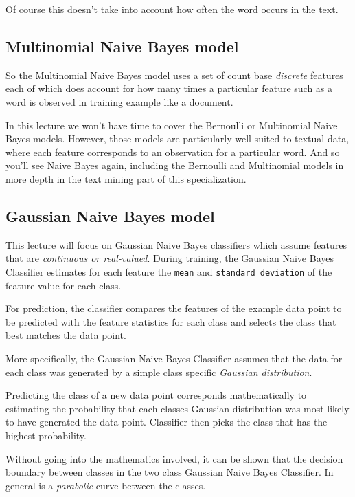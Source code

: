 Of course this doesn't take into account how often the word occurs in the text. 

\subsection{Multinomial Naive Bayes model}

So the Multinomial Naive Bayes model uses a set of count base \emph{discrete} features each of which does account for how many times a particular feature such as a word is observed in training example like a document. 

In this lecture we won't have time to cover the Bernoulli or Multinomial Naive Bayes models. However, those models are particularly well suited to textual data, where each feature corresponds to an observation for a particular word. And so you'll see Naive Bayes again, including the Bernoulli and Multinomial models in more depth in the text mining part of this specialization. 

\subsection{Gaussian Naive Bayes model}

This lecture will focus on Gaussian Naive Bayes classifiers which assume features that are \emph{continuous or real-valued}. During training, the Gaussian Naive Bayes Classifier estimates for each feature the \texttt{mean} and \texttt{standard deviation} of the feature value for each class. 

For prediction, the classifier compares the features of the example data point to be predicted with the feature statistics for each class and selects the class that best matches the data point. 

More specifically, the Gaussian Naive Bayes Classifier assumes that the data for each class was generated by a simple class specific \emph{Gaussian distribution}. 

Predicting the class of a new data point corresponds mathematically to estimating the probability that each classes Gaussian distribution was most likely to have generated the data point. Classifier then picks the class that has the highest probability. 

Without going into the mathematics involved, it can be shown that the decision boundary between classes in the two class Gaussian Naive Bayes Classifier. In general is a \emph{parabolic} curve between the classes. 

